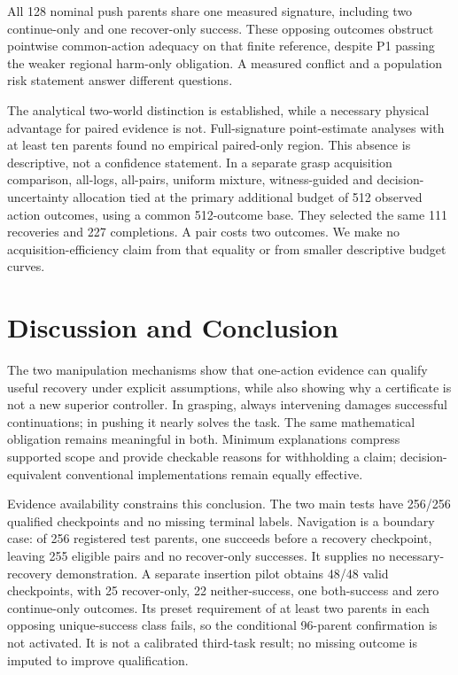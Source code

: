 \documentclass[conference]{IEEEtran}
\begin{document}
All 128 nominal push parents share one measured signature, including two continue-only and one recover-only success. These opposing outcomes obstruct pointwise common-action adequacy on that finite reference, despite P1 passing the weaker regional harm-only obligation. A measured conflict and a population risk statement answer different questions.

The analytical two-world distinction is established, while a necessary physical advantage for paired evidence is not. Full-signature point-estimate analyses with at least ten parents found no empirical paired-only region. This absence is descriptive, not a confidence statement. In a separate grasp acquisition comparison, all-logs, all-pairs, uniform mixture, witness-guided and decision-uncertainty allocation tied at the primary additional budget of 512 observed action outcomes, using a common 512-outcome base. They selected the same 111 recoveries and 227 completions. A pair costs two outcomes. We make no acquisition-efficiency claim from that equality or from smaller descriptive budget curves.

\section{Discussion and Conclusion}
The two manipulation mechanisms show that one-action evidence can qualify useful recovery under explicit assumptions, while also showing why a certificate is not a new superior controller. In grasping, always intervening damages successful continuations; in pushing it nearly solves the task. The same mathematical obligation remains meaningful in both. Minimum explanations compress supported scope and provide checkable reasons for withholding a claim; decision-equivalent conventional implementations remain equally effective.

Evidence availability constrains this conclusion. The two main tests have 256/256 qualified checkpoints and no missing terminal labels. Navigation is a boundary case: of 256 registered test parents, one succeeds before a recovery checkpoint, leaving 255 eligible pairs and no recover-only successes. It supplies no necessary-recovery demonstration. A separate insertion pilot obtains 48/48 valid checkpoints, with 25 recover-only, 22 neither-success, one both-success and zero continue-only outcomes. Its preset requirement of at least two parents in each opposing unique-success class fails, so the conditional 96-parent confirmation is not activated. It is not a calibrated third-task result; no missing outcome is imputed to improve qualification.
\end{document}
